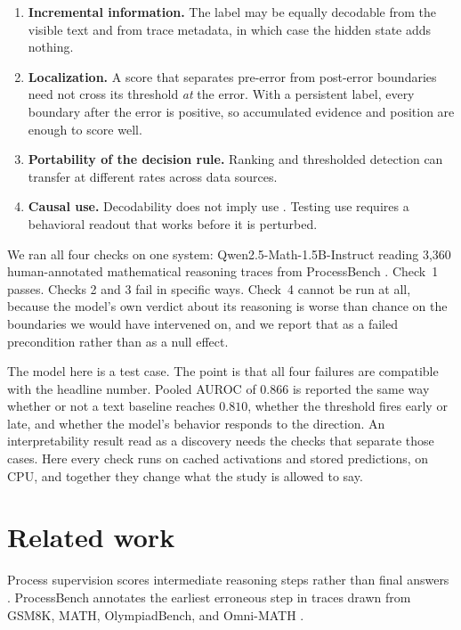 \documentclass{article}
\newcommand{\model}{Qwen2.5-Math-1.5B-Instruct}
\newcommand{\dataset}{ProcessBench}
\begin{document}
\begin{enumerate}
\setlength{\itemsep}{0pt}
\item \textbf{Incremental information.} The label may be equally decodable from the visible text
and from trace metadata, in which case the hidden state adds nothing.
\item \textbf{Localization.} A score that separates pre-error from post-error boundaries need not
cross its threshold \emph{at} the error. With a persistent label, every boundary after the error is
positive, so accumulated evidence and position are enough to score well.
\item \textbf{Portability of the decision rule.} Ranking and thresholded detection can transfer at
different rates across data sources.
\item \textbf{Causal use.} Decodability does not imply use
\citep{hewitt2019control,belinkov2022probing,elazar2021amnesic}. Testing use requires a behavioral
readout that works before it is perturbed.
\end{enumerate}

We ran all four checks on one system: \model{} \citep{yang2024qwenmath} reading 3,360 human-annotated
mathematical reasoning traces from \dataset{} \citep{zheng2025processbench}. Check~1 passes. Checks
2 and 3 fail in specific ways. Check~4 cannot be run at all, because the model's own verdict about
its reasoning is worse than chance on the boundaries we would have intervened on, and we report
that as a failed precondition rather than as a null effect.

The model here is a test case. The point is that all four failures are compatible with the
headline number. Pooled AUROC of $0.866$ is reported the same way whether or not a text baseline
reaches $0.810$, whether the threshold fires early or late, and whether the model's behavior
responds to the direction. An interpretability result read as a discovery needs the checks that
separate those cases. Here every check runs on cached activations and stored predictions, on CPU, and
together they change what the study is allowed to say.

\section{Related work}

Process supervision scores intermediate reasoning steps rather than final answers
\citep{cobbe2021verifiers,lightman2023verify,li2023stepaware}. \dataset{} annotates the earliest
erroneous step in traces drawn from GSM8K, MATH, OlympiadBench, and Omni-MATH
\citep{zheng2025processbench,hendrycks2021math,he2024olympiadbench,gao2024omnimath}.
\end{document}
